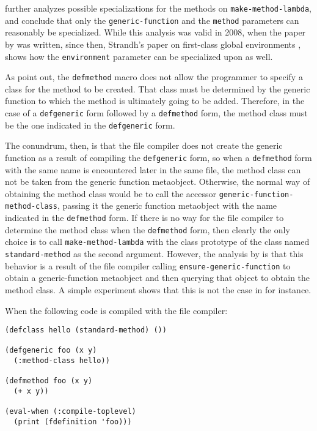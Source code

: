 \cnh{} further analyzes possible specializations for the
methods on \texttt{make-method-lambda}, and conclude that only the
\texttt{generic-function} and the \texttt{method} parameters can
reasonably be specialized.  While this analysis was valid in 2008,
when the paper by \cnh{} was written, since then,
Strandh's paper on first-class global environments
\cite{Strandh:2015:ELS:Environments}, shows how the
\texttt{environment} parameter can be specialized upon as well.

As \cnh{} point out, the \texttt{defmethod} macro does
not allow the programmer to specify a class for the method to be
created.  That class must be determined by the generic function to
which the method is ultimately going to be added.  Therefore, in the
case of a \texttt{defgeneric} form followed by a \texttt{defmethod}
form, the method class must be the one indicated in the
\texttt{defgeneric} form.

The conundrum, then, is that the file compiler does not create the
generic function as a result of compiling the \texttt{defgeneric}
form, so when a \texttt{defmethod} form with the same name is
encountered later in the same file, the method class can not be taken
from the generic function metaobject.  Otherwise, the normal way of
obtaining the method class would be to call the accessor
\texttt{generic-function-method-class}, passing it the generic
function metaobject with the name indicated in the \texttt{defmethod}
form.  If there is no way for the file compiler to determine the
method class when the \texttt{defmethod} form, then clearly the only
choice is to call \texttt{make-method-lambda} with the class prototype
of the class named \texttt{standard-method} as the second argument.
However, the analysis by \cnh{} is that this behavior is
a result of the file compiler calling \texttt{ensure-generic-function}
to obtain a generic-function metaobject and then querying that object
to obtain the method class.  A simple experiment shows that this is
not the case in \sbcl{} for instance.

When the following code is compiled with the \sbcl{} file compiler:

\begin{verbatim}
(defclass hello (standard-method) ())

(defgeneric foo (x y)
  (:method-class hello))

(defmethod foo (x y)
  (+ x y))

(eval-when (:compile-toplevel)
  (print (fdefinition 'foo)))
\end{verbatim}

